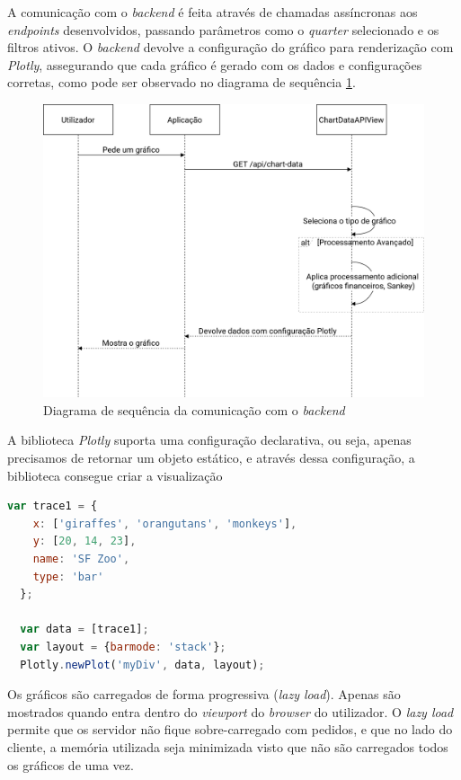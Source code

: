 A comunicação com o \textit{backend} é feita através de chamadas assíncronas aos \textit{endpoints} desenvolvidos, passando parâmetros como o \textit{quarter} selecionado e os filtros ativos. O \textit{backend} devolve a configuração do gráfico para renderização com \textit{Plotly}, assegurando que cada gráfico é gerado com os dados e configurações corretas, como pode ser observado no diagrama de sequência \ref{fig:sequence}.

\begin{figure}[H]
    \centering
    \includegraphics[max width=\textwidth]{./img/sequence}
 \caption{Diagrama de sequência da comunicação com o \textit{backend}}
 \label{fig:sequence}
\end{figure}

A biblioteca \textit{Plotly} suporta uma configuração declarativa, ou seja, apenas precisamos de retornar um objeto estático, e através dessa configuração, a biblioteca consegue criar a visualização

\begin{lstlisting}[language=Javascript, caption={Excerto de uma configuração para um gráfico com a utilização da biblioteca \textit{Plotly}}]
  var trace1 = {
    x: ['giraffes', 'orangutans', 'monkeys'],
    y: [20, 14, 23],
    name: 'SF Zoo',
    type: 'bar'
  };
  
  var data = [trace1];
  var layout = {barmode: 'stack'};
  Plotly.newPlot('myDiv', data, layout);
\end{lstlisting}

Os gráficos são carregados de forma progressiva (\textit{lazy load}). Apenas são mostrados quando entra dentro do \textit{viewport} do \textit{browser} do utilizador. O \textit{lazy load} permite que os servidor não fique sobre-carregado com pedidos, e que no lado do cliente, a memória utilizada seja minimizada visto que não são carregados todos os gráficos de uma vez.	

